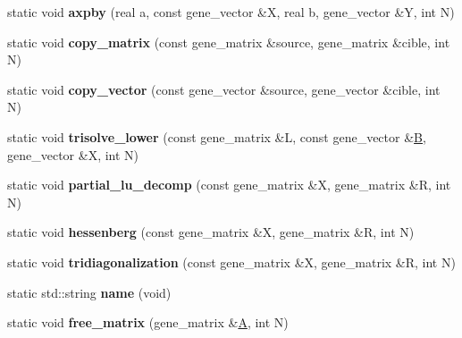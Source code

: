 \begin{DoxyCompactItemize}
static void {\bfseries axpby} (real a, const gene\+\_\+vector \&X, real b, gene\+\_\+vector \&Y, int N)
\item 
\mbox{\label{classgmm__interface_aa7c05e04a4584bbc1fb96933aef2d626}} 
static void {\bfseries copy\+\_\+matrix} (const gene\+\_\+matrix \&source, gene\+\_\+matrix \&cible, int N)
\item 
\mbox{\label{classgmm__interface_aca31758483bf3665afac4e2039e852cd}} 
static void {\bfseries copy\+\_\+vector} (const gene\+\_\+vector \&source, gene\+\_\+vector \&cible, int N)
\item 
\mbox{\label{classgmm__interface_abea99a97020bbe936bd6187980b4a485}} 
static void {\bfseries trisolve\+\_\+lower} (const gene\+\_\+matrix \&L, const gene\+\_\+vector \&\hyperlink{group___core___module_class_eigen_1_1_matrix}{B}, gene\+\_\+vector \&X, int N)
\item 
\mbox{\label{classgmm__interface_a199ec7e27ecab364d889f5317885b8b7}} 
static void {\bfseries partial\+\_\+lu\+\_\+decomp} (const gene\+\_\+matrix \&X, gene\+\_\+matrix \&R, int N)
\item 
\mbox{\label{classgmm__interface_a07c8359f77d9d52fdb35009acf1f7b37}} 
static void {\bfseries hessenberg} (const gene\+\_\+matrix \&X, gene\+\_\+matrix \&R, int N)
\item 
\mbox{\label{classgmm__interface_ad184d3cbcb2a3e484720e23696fe79fd}} 
static void {\bfseries tridiagonalization} (const gene\+\_\+matrix \&X, gene\+\_\+matrix \&R, int N)
\item 
\mbox{\label{classgmm__interface_a847915dbbfe39cc8a4c084f7cf32e467}} 
static std\+::string {\bfseries name} (void)
\item 
\mbox{\label{classgmm__interface_a9c8560b6e2eecaac270e030c20f37f33}} 
static void {\bfseries free\+\_\+matrix} (gene\+\_\+matrix \&\hyperlink{group___core___module_class_eigen_1_1_matrix}{A}, int N)
\item 
\mbox{\label{classgmm__interface_a17da0b9e23043f5c1a825b9c39e826e0}} 

\end{DoxyCompactItemize}
